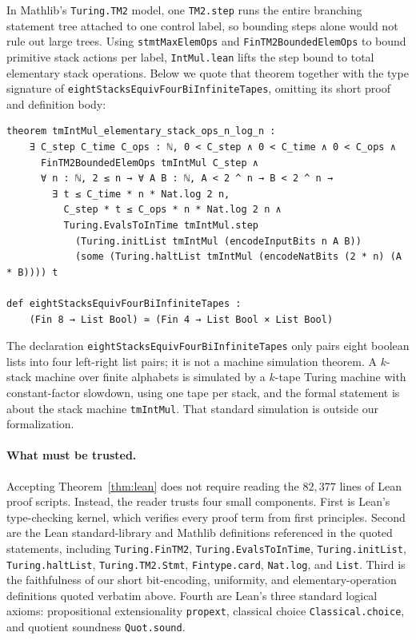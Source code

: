 {\sloppy In Mathlib's \texttt{Turing.TM2} model, one \texttt{TM2.step} runs the entire branching statement tree attached to one control label, so bounding steps alone would not rule out large trees. Using \texttt{stmtMaxElemOps} and \texttt{FinTM2\allowbreak Bounded\allowbreak ElemOps} to bound primitive stack actions per label, \texttt{IntMul.lean} lifts the step bound to total elementary stack operations. Below we quote that theorem together with the type signature of \texttt{eightStacks\allowbreak Equiv\allowbreak Four\allowbreak BiInfinite\allowbreak Tapes}, omitting its short proof and definition body:\par}
\begin{Verbatim}[fontsize=\footnotesize,frame=single,framesep=2mm]
theorem tmIntMul_elementary_stack_ops_n_log_n :
    ∃ C_step C_time C_ops : ℕ, 0 < C_step ∧ 0 < C_time ∧ 0 < C_ops ∧
      FinTM2BoundedElemOps tmIntMul C_step ∧
      ∀ n : ℕ, 2 ≤ n → ∀ A B : ℕ, A < 2 ^ n → B < 2 ^ n →
        ∃ t ≤ C_time * n * Nat.log 2 n,
          C_step * t ≤ C_ops * n * Nat.log 2 n ∧
          Turing.EvalsToInTime tmIntMul.step
            (Turing.initList tmIntMul (encodeInputBits n A B))
            (some (Turing.haltList tmIntMul (encodeNatBits (2 * n) (A * B)))) t

def eightStacksEquivFourBiInfiniteTapes :
    (Fin 8 → List Bool) ≃ (Fin 4 → List Bool × List Bool)
\end{Verbatim}

The declaration \texttt{eightStacks\allowbreak Equiv\allowbreak Four\allowbreak BiInfinite\allowbreak Tapes} only pairs eight boolean lists into four left-right list pairs; it is not a machine simulation theorem. A $k$-stack machine over finite alphabets is simulated by a $k$-tape Turing machine with constant-factor slowdown, using one tape per stack, and the formal statement is about the stack machine \texttt{tmIntMul}. That standard simulation is outside our formalization.

\paragraph{What must be trusted.}
Accepting Theorem~\ref{thm:lean} does not require reading the $82{,}377$ lines of Lean proof scripts. Instead, the reader trusts four small components. First is Lean's type-checking kernel, which verifies every proof term from first principles. Second are the Lean standard-library and Mathlib definitions referenced in the quoted statements, including \texttt{Turing.FinTM2}, \texttt{Turing.EvalsToInTime}, \texttt{Turing.initList}, \texttt{Turing.haltList}, \texttt{Turing.TM2.Stmt}, \texttt{Fintype.card}, \texttt{Nat.log}, and \texttt{List}. Third is the faithfulness of our short bit-encoding, uniformity, and elementary-operation definitions quoted verbatim above. Fourth are Lean's three standard logical axioms: propositional extensionality \texttt{propext}, classical choice \texttt{Classical.choice}, and quotient soundness \texttt{Quot.sound}.

